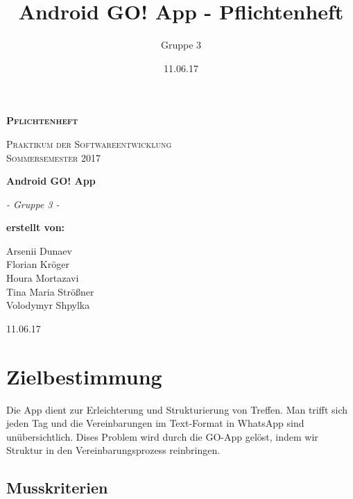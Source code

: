 \documentclass[parskip=full]{scrartcl}
\title{Android GO! App - Pflichtenheft}
\author{Gruppe 3}
\date{11.06.17}
\begin{document}
\begin{titlepage}
	\begin{center}
	{\scshape\LARGE \bfseries Pflichtenheft \par}
	\vspace{1cm}
	{\scshape\Large Praktikum der Softwareentwicklung \\ Sommersemester 2017\par}
	\vspace{1.5cm}
	{\huge\bfseries Android GO! App\par}
	\vspace{2cm}
	{\Large\itshape - Gruppe 3 -\par}
	\vfill
	{\bfseries erstellt von:\par}
	Arsenii Dunaev \\
	Florian Kröger \\
	Houra Mortazavi \\ %
	Tina Maria Strößner \\
	Volodymyr Shpylka \\	
	\vfill
	{\large 11.06.17 \par}	
	\end{center}
\end{titlepage}

\tableofcontents

\newpage
\section{Zielbestimmung}
Die \gls{App} dient zur Erleichterung und Strukturierung von Treffen. 
Man trifft sich jeden Tag und die Vereinbarungen im Text-Format in WhatsApp sind unübersichtlich. 
Dises Problem wird durch die GO-App gelöst, indem wir Struktur in den Vereinbarungsprozess reinbringen.  
\subsection{Musskriterien}
\end{document}
